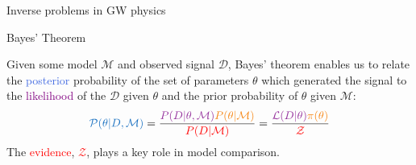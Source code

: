 \documentclass[aspectratio=169, 11pt]{beamer}
\begin{document}
\begin{frame}{Inverse problems in GW physics}

\end{frame}

\begin{frame}{Bayes' Theorem}

Given some model $\mathcal{M}$ and observed signal $\mathcal{D}$, Bayes' theorem enables us to relate the \textcolor{RoyalBlue}{posterior} probability of the set of parameters $\theta$ which generated the signal to the \textcolor{Purple}{likelihood} of the $\mathcal{D}$ given $\theta$ and the \textcolor{BurntOrange}{prior} probability of $\theta$ given $\mathcal{M}$:
\vfill
\begin{equation}
    \textcolor{RoyalBlue}{\mathcal{P}(\theta | D, \mathcal{M})} = \frac{\textcolor{Purple}{P(D | \theta, \mathcal{M})} \textcolor{BurntOrange}{P(\theta | \mathcal{M})}}{\textcolor{red}{P(D | \mathcal{M})}} = \frac{\textcolor{Purple}{\mathcal{L}(D | \theta)} \textcolor{BurntOrange}{\pi(\theta)}}{\textcolor{red}{\mathcal{Z}}}
\end{equation}
\vfill
The \textcolor{red}{evidence}, \textcolor{red}{$\mathcal{Z}$}, plays a key role in model comparison.
\end{frame}
\end{document}
